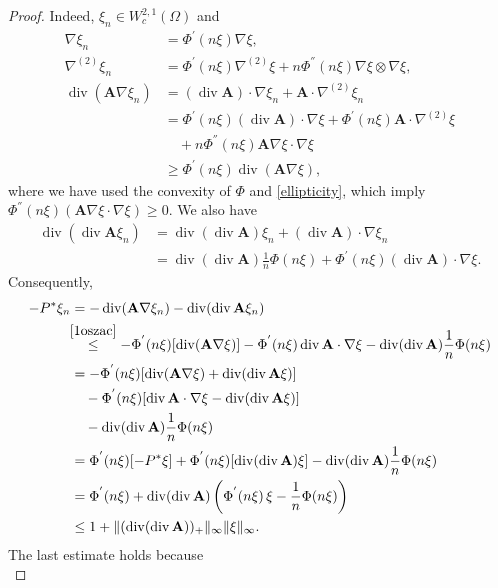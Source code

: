 \documentclass[12pt,a4paper]{amsart}
\theoremstyle{definition}
\newcommand{\A}{\mathbf{A}}
\newcommand*\Div{\operatorname{div}}
\begin{document}
\begin{proof}
    Indeed, $\xi_n\in W^{2,1}_c(\Omega)$ and
    \begin{align}
        \nabla \xi_n   &=\Phi^{'}(n\xi )\nabla\xi  ,\nonumber\\
        \nabla^{(2)}\xi_n  &= \Phi^{'}(n\xi )\nabla^{(2)}\xi  + n\Phi^{''}(n\xi )\nabla\xi  \otimes \nabla\xi  ,\nonumber\\
        \Div(\A\nabla\xi_n) &= (\Div\A)\cdot \nabla\xi_n + \A\cdot \nabla^{(2)}\xi_n\label{1oszac}\\
        &= \Phi^{'}(n\xi )(\Div\A)\cdot \nabla\xi   + \Phi^{'}(n\xi ) \A\cdot\nabla^{(2)}\xi  \nonumber\\ 
        & \quad + n\Phi^{''}(n\xi ) \A \nabla\xi  \cdot \nabla\xi  \nonumber\\
        &\ge  \Phi^{'}(n\xi )\Div(\A \nabla\xi ) ,\nonumber
    \end{align}
    where we have used the convexity of $\Phi$ and \eqref{ellipticity}, which imply $\Phi^{''}(n\xi )(\A \nabla\xi \cdot\nabla \xi)\ge 0$.
    We also have
    \begin{align}\label{eq:divdivterm}
    \Div(\Div\A\xi_n) &= \Div(\Div\A)\xi_n + (\Div\A)\cdot\nabla \xi_n\\
    &= \Div(\Div\A)\frac{1}{n}\Phi(n\xi ) + 
     \Phi^{'}(n\xi )(\Div\A)\cdot \nabla\xi  \nonumber. 
    \end{align}
    Consequently,
    \begin{align*}
    -P^*\xi_n &= -\Div(\A\nabla\xi_n) - \Div(\Div\A\xi_n)\\
    &\! \!\stackrel{\eqref{1oszac} }{\le}  - \Phi^{'}(n\xi )[\Div(\A\nabla\xi )]  -  \Phi^{'}(n\xi ) \Div\A\cdot \nabla\xi   - \Div(\Div\A)\frac{1}{n}\Phi(n\xi )\\
    &=  -\Phi^{'}(n\xi )[ \Div(\A \nabla\xi ) + \Div(\Div\A \xi )]  \\ &\quad -  \Phi^{'}(n\xi )[\Div\A\cdot \nabla\xi  
    -\Div(\Div\A \xi )]\\
    &\quad - \Div(\Div\A)\frac{1}{n}\Phi(n\xi )\\
    &= \Phi^{'}(n\xi )[-P^*\xi] + \Phi^{'}(n\xi )
    [\Div(\Div\A ) \xi] -  \Div(\Div\A)\frac{1}{n}\Phi(n\xi )\\
    &=  \Phi^{'}(n\xi ) +   \Div(\Div\A )\left( \Phi^{'}(n\xi )\, \xi - \frac{1}{n}\Phi(n\xi )\right) \\
    &\le 1+ \| (\Div(\Div\A ))_+\|_{\infty}\|\xi\|_\infty.
    \end{align*}
    The last estimate holds because
    \begin{equation*}

\end{equation*}
\end{proof}
\end{document}
